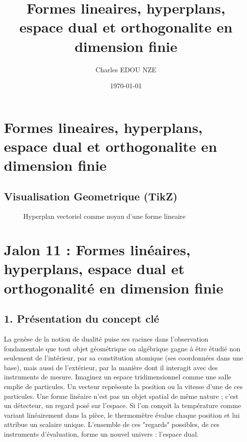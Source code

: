 \documentclass[11pt,a4paper]{report}
\title{Formes lineaires, hyperplans, espace dual et orthogonalite en dimension finie}
\author{Charles EDOU NZE}
\date{\today}
\begin{document}
\maketitle
\tableofcontents

\chapter{Formes lineaires, hyperplans, espace dual et orthogonalite en dimension finie}

\section{Visualisation Geometrique (TikZ)}

\begin{figure}[h]
\centering
{}
\caption{Hyperplan vectoriel comme noyau d'une forme lineaire}
\end{figure}

\chapter{Jalon 11 : Formes linéaires, hyperplans, espace dual et orthogonalité en dimension finie}

\section{1. Présentation du concept clé}

La genèse de la notion de dualité puise ses racines dans l'observation fondamentale que tout objet géométrique ou algébrique gagne à être étudié non seulement de l'intérieur, par sa constitution atomique (ses coordonnées dans une base), mais aussi de l'extérieur, par la manière dont il interagit avec des instruments de mesure. Imaginez un espace tridimensionnel comme une salle emplie de particules. Un vecteur représente la position ou la vitesse d'une de ces particules. Une forme linéaire n'est pas un objet spatial de même nature ; c'est un détecteur, un regard posé sur l'espace. Si l'on conçoit la température comme variant linéairement dans la pièce, le thermomètre évalue chaque position et lui attribue un scalaire unique. L'ensemble de ces "regards" possibles, de ces instruments d'évaluation, forme un nouvel univers : l'espace dual.
\end{document}
